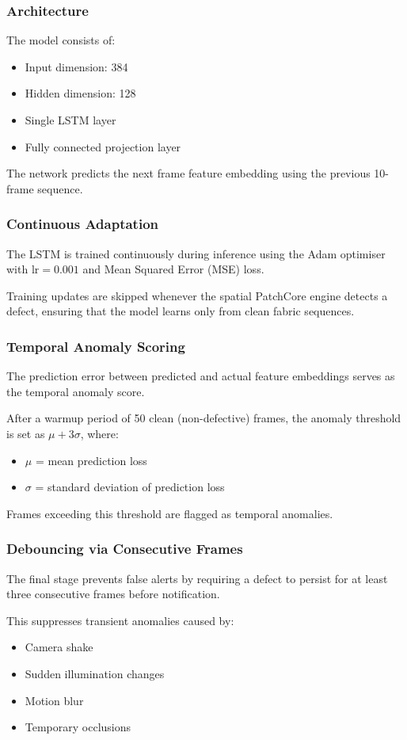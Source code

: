\documentclass{ieeeaccess}
\begin{document}
\subsubsection{Architecture}
The model consists of:
\begin{itemize}
    \item Input dimension: 384
    \item Hidden dimension: 128
    \item Single LSTM layer
    \item Fully connected projection layer
\end{itemize}
The network predicts the next frame feature embedding using the previous 10-frame sequence.

\subsubsection{Continuous Adaptation}
The LSTM is trained continuously during inference using the Adam optimiser with $\text{lr} = 0.001$ and Mean Squared Error (MSE) loss.

Training updates are skipped whenever the spatial PatchCore engine detects a defect, ensuring that the model learns only from clean fabric sequences.

\subsubsection{Temporal Anomaly Scoring}
The prediction error between predicted and actual feature embeddings serves as the temporal anomaly score.

After a warmup period of 50 clean (non-defective) frames, the anomaly threshold is set as $\mu + 3\sigma$, where:
\begin{itemize}
    \item $\mu$ = mean prediction loss
    \item $\sigma$ = standard deviation of prediction loss
\end{itemize}
Frames exceeding this threshold are flagged as temporal anomalies.

\subsubsection{Debouncing via Consecutive Frames}
The final stage prevents false alerts by requiring a defect to persist for at least three consecutive frames before notification.

This suppresses transient anomalies caused by:
\begin{itemize}
    \item Camera shake
    \item Sudden illumination changes
    \item Motion blur
    \item Temporary occlusions
\end{itemize}
\end{document}
